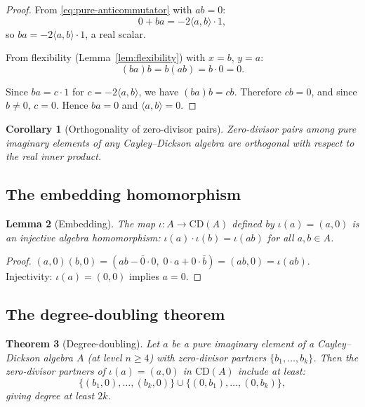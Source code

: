 \documentclass[12pt,a4paper]{article}
\newtheorem{theorem}{Theorem}[section]
\newtheorem{lemma}[theorem]{Lemma}
\newtheorem{corollary}[theorem]{Corollary}
\theoremstyle{definition}
\theoremstyle{remark}
\newcommand{\CD}{\mathrm{CD}}
\begin{document}
\begin{proof}
From \eqref{eq:pure-anticommutator} with $ab = 0$:
\[
  0 + ba = -2\langle a, b \rangle \cdot 1,
\]
so $ba = -2\langle a, b \rangle \cdot 1$, a real scalar.

From flexibility (Lemma~\ref{lem:flexibility}) with $x = b$,
$y = a$:
\[
  (ba)b = b(ab) = b \cdot 0 = 0.
\]

Since $ba = c \cdot 1$ for $c = -2\langle a, b \rangle$, we have
$(ba)b = cb$. Therefore $cb = 0$, and since $b \neq 0$, $c = 0$.
Hence $ba = 0$ and $\langle a, b \rangle = 0$.
\end{proof}

\begin{corollary}[Orthogonality of zero-divisor pairs]
\label{cor:orthogonality}
Zero-divisor pairs among pure imaginary elements of any
Cayley--Dickson algebra are orthogonal with respect to the real
inner product.
\end{corollary}

\subsection{The embedding homomorphism}

\begin{lemma}[Embedding]
\label{lem:embedding}
The map $\iota \colon A \to \CD(A)$ defined by $\iota(a) = (a, 0)$
is an injective algebra homomorphism:
$\iota(a) \cdot \iota(b) = \iota(ab)$ for all $a, b \in A$.
\end{lemma}

\begin{proof}
$(a, 0)(b, 0) = (ab - \bar{0} \cdot 0,\; 0 \cdot a + 0 \cdot
\bar{b}) = (ab, 0) = \iota(ab)$.
Injectivity: $\iota(a) = (0, 0)$ implies $a = 0$.
\end{proof}

\subsection{The degree-doubling theorem}

\begin{theorem}[Degree-doubling]
\label{thm:degree-doubling}
Let $a$ be a pure imaginary element of a Cayley--Dickson algebra
$A$ (at level $n \geq 4$) with zero-divisor partners
$\{b_1, \ldots, b_k\}$. Then the zero-divisor partners of
$\iota(a) = (a, 0)$ in $\CD(A)$ include at least:
\[
  \{(b_1, 0), \ldots, (b_k, 0)\} \cup
  \{(0, b_1), \ldots, (0, b_k)\},
\]
giving degree at least $2k$.
\end{theorem}
\end{document}

